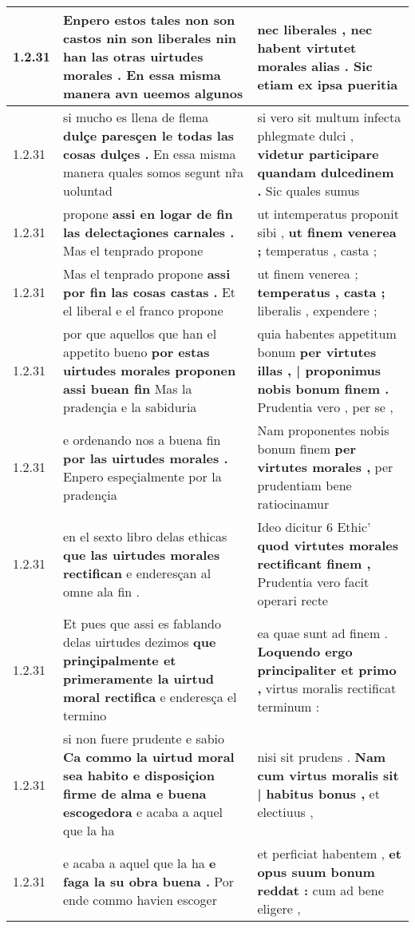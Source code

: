 \begin{tabular}{|p{1cm}|p{6.5cm}|p{6.5cm}|}
1.2.31 & Enpero estos tales non son castos nin son liberales \textbf{ nin han las otras uirtudes morales . } En essa misma manera avn ueemos algunos & nec liberales , \textbf{ nec habent virtutet morales alias . } Sic etiam ex ipsa pueritia \\\hline
1.2.31 & si mucho es llena de flema \textbf{ dulçe paresçen le todas las cosas dulçes . } En essa misma manera quales somos segunt nr̃a uoluntad & si vero sit multum infecta phlegmate dulci , \textbf{ videtur participare quandam dulcedinem . } Sic quales sumus \\\hline
1.2.31 & propone \textbf{ assi en logar de fin las delectaçiones carnales . } Mas el tenprado propone & ut intemperatus proponit sibi , \textbf{ ut finem venerea ; } temperatus , casta ; \\\hline
1.2.31 & Mas el tenprado propone \textbf{ assi por fin las cosas castas . } Et el liberal e el franco propone & ut finem venerea ; \textbf{ temperatus , casta ; } liberalis , expendere ; \\\hline
1.2.31 & por que aquellos que han el appetito bueno \textbf{ por estas uirtudes morales proponen assi buean fin } Mas la pradençia e la sabiduria & quia habentes appetitum bonum \textbf{ per virtutes illas , | proponimus nobis bonum finem . } Prudentia vero , per se , \\\hline
1.2.31 & e ordenando nos a buena fin \textbf{ por las uirtudes morales . } Enpero espeçialmente por la pradençia & Nam proponentes nobis bonum finem \textbf{ per virtutes morales , } per prudentiam bene ratiocinamur \\\hline
1.2.31 & en el sexto libro delas ethicas \textbf{ que las uirtudes morales rectifican } e enderesçan al omne ala fin . & Ideo dicitur 6 Ethic’ \textbf{ quod virtutes morales rectificant finem , } Prudentia vero facit operari recte \\\hline
1.2.31 & Et pues que assi es fablando delas uirtudes dezimos \textbf{ que prinçipalmente et primeramente la uirtud moral rectifica } e enderesça el termino & ea quae sunt ad finem . \textbf{ Loquendo ergo principaliter et primo , } virtus moralis rectificat terminum : \\\hline
1.2.31 & si non fuere prudente e sabio \textbf{ Ca commo la uirtud moral sea habito e disposiçion firme de alma e buena escogedora } e acaba a aquel que la ha & nisi sit prudens . \textbf{ Nam cum virtus moralis sit | habitus bonus , } et electiuus , \\\hline
1.2.31 & e acaba a aquel que la ha \textbf{ e faga la su obra buena . } Por ende commo havien escoger & et perficiat habentem , \textbf{ et opus suum bonum reddat : } cum ad bene eligere , \\\hline

\end{tabular}
